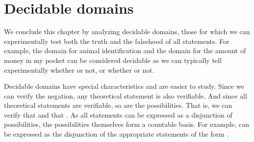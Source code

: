 	\section{Decidable domains}
	
	We conclude this chapter by analyzing decidable domains, those for which we can experimentally test both the truth and the falsehood of all statements. For example, the domain for animal identification and the domain for the amount of money in my pocket can be considered decidable as we can typically tell experimentally whether  or not, or whether  or not.
	
	Decidable domains have special characteristics and are easier to study. Since we can verify the negation, any theoretical statement is also verifiable. And since all theoretical statements are verifiable, so are the possibilities. That is, we can verify that  and that . As all statements can be expressed as a disjunction of possibilities, the possibilities themselves form a countable basis. For example,  can be expressed as the disjunction of the appropriate statements of the form .
	
